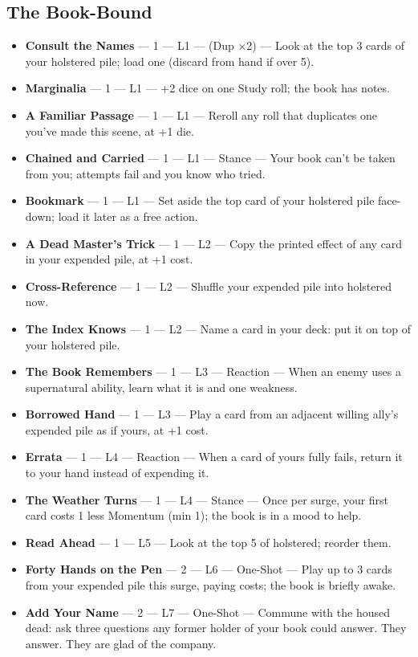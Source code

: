 \subsection{The Book-Bound}
\begin{itemize}
    \item \textbf{Consult the Names} --- 1 --- L1 --- (Dup ×2) --- Look at the top 3 cards of your holstered pile; load one (discard from hand if over 5).
    \item \textbf{Marginalia} --- 1 --- L1 --- +2 dice on one Study roll; the book has notes.
    \item \textbf{A Familiar Passage} --- 1 --- L1 --- Reroll any roll that duplicates one you've made this scene, at +1 die.
    \item \textbf{Chained and Carried} --- 1 --- L1 --- Stance --- Your book can't be taken from you; attempts fail and you know who tried.
    \item \textbf{Bookmark} --- 1 --- L1 --- Set aside the top card of your holstered pile face-down; load it later as a free action.
    \item \textbf{A Dead Master's Trick} --- 1 --- L2 --- Copy the printed effect of any card in your expended pile, at +1 cost.
    \item \textbf{Cross-Reference} --- 1 --- L2 --- Shuffle your expended pile into holstered now.
    \item \textbf{The Index Knows} --- 1 --- L2 --- Name a card in your deck: put it on top of your holstered pile.
    \item \textbf{The Book Remembers} --- 1 --- L3 --- Reaction --- When an enemy uses a supernatural ability, learn what it is and one weakness.
    \item \textbf{Borrowed Hand} --- 1 --- L3 --- Play a card from an adjacent willing ally's expended pile as if yours, at +1 cost.
    \item \textbf{Errata} --- 1 --- L4 --- Reaction --- When a card of yours fully fails, return it to your hand instead of expending it.
    \item \textbf{The Weather Turns} --- 1 --- L4 --- Stance --- Once per surge, your first card costs 1 less Momentum (min 1); the book is in a mood to help.
    \item \textbf{Read Ahead} --- 1 --- L5 --- Look at the top 5 of holstered; reorder them.
    \item \textbf{Forty Hands on the Pen} --- 2 --- L6 --- One-Shot --- Play up to 3 cards from your expended pile this surge, paying costs; the book is briefly awake.
    \item \textbf{Add Your Name} --- 2 --- L7 --- One-Shot --- Commune with the housed dead: ask three questions any former holder of your book could answer. They answer. They are glad of the company.
\end{itemize}

